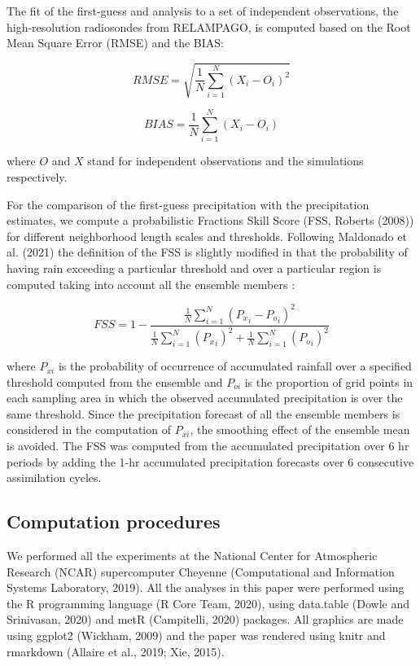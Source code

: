 \documentclass[final,5p,times,twocolumn,authoryear]{elsarticle} %
\begin{document}
The fit of the first-guess and analysis to a set of independent observations, the high-resolution radiosondes from RELAMPAGO, is computed based on the Root Mean Square Error (RMSE) and the BIAS:

\[\mathit{RMSE} = \sqrt{\frac{1}{N}\sum_{i = 1}^{N} (X_i - O_i)^{2}}\]

\[\mathit{BIAS} = \frac{1}{N}\sum_{i = 1}^{N} (X_i - O_i)\]

where \(O\) and \(X\) stand for independent observations and the simulations respectively.

For the comparison of the first-guess precipitation with the precipitation estimates, we compute a probabilistic Fractions Skill Score (FSS, Roberts (2008)) for different neighborhood length scales and thresholds. Following Maldonado et al. (2021) the definition of the FSS is slightly modified in that the probability of having rain exceeding a particular threshold and over a particular region is computed taking into account all the ensemble members :

\[\mathit{FSS} = 1-\frac{\frac{1}{N}\sum_{i=1}^{N} ({P_x}_i-{P_o}_i)^{2}}{\frac{1}{N}\sum_{i=1}^{N} ({P_x}_i)^{2}+\frac{1}{N}\sum_{i=1}^{N} ({P_o}_i)^{2}} \]

where \(P_{xi}\) is the probability of occurrence of accumulated rainfall over a specified threshold computed from the ensemble and \(P_{oi}\) is the proportion of grid points in each sampling area in which the observed accumulated precipitation is over the same threshold. Since the precipitation forecast of all the ensemble members is considered in the computation of \(P_{xi}\), the smoothing effect of the ensemble mean is avoided. The FSS was computed from the accumulated precipitation over 6 hr periods by adding the 1-hr accumulated precipitation forecasts over 6 consecutive assimilation cycles.

\hypertarget{computation-procedures}{%
\subsection{Computation procedures}\label{computation-procedures}}

We performed all the experiments at the National Center for Atmospheric Research (NCAR) supercomputer Cheyenne (Computational and Information Systems Laboratory, 2019). All the analyses in this paper were performed using the R programming language (R Core Team, 2020), using data.table (Dowle and Srinivasan, 2020) and metR (Campitelli, 2020) packages.
All graphics are made using ggplot2 (Wickham, 2009) and the paper was rendered using knitr and rmarkdown (Allaire et al., 2019; Xie, 2015).
\end{document}
